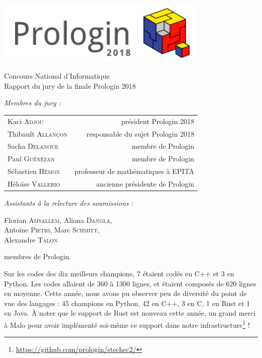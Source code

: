 \documentclass[a4paper,12pt,notitle,noheader,nofooter]{prologin}
\begin{document}
\begin{titlepage}
\begin{center}
\includegraphics[width=10cm]{../prologin2018}

\vspace{2.4cm}
{
 \Huge \textsf{Concours National d'Informatique}\\
 \vspace{1em}
 \Large Rapport du jury de la finale Prologin 2018
 \vspace{0.5cm}
}
\end{center}
\textit{Membres du jury :}
\begin{center}
\begin{tabular}{l r}
Kaci \textsc{Adjou} & président Prologin 2018 \\
Thibault \textsc{Allançon} & responsable du sujet Prologin 2018 \\
Sacha \textsc{Delanoue} & membre de Prologin \\
Paul \textsc{Guénézan} & membre de Prologin \\
Sébastien \textsc{Hémon} & professeur de mathématiques à EPITA \\
Héloïse \textsc{Vallerio} & ancienne présidente de Prologin
\end{tabular}
\end{center}
\textit{Assistants à la relecture des soumissions :}
\begin{center}
Florian \textsc{Amsallem}, Aliona \textsc{Dangla}, \\
Antoine \textsc{Pietri}, Marc \textsc{Schmitt}, \\
Alexandre \textsc{Talon}

\end{center}
\quad membres de Prologin.
\end{titlepage}


Sur les codes des dix meilleurs champions, 7 étaient codés en C++ et 3 en
Python. Les codes allaient de 360 à 1300 lignes, et étaient composés de 620
lignes en moyenne. Cette année, nous avons pu observer peu de diversité du point
de vue des langages : 45 champions en Python, 42 en C++, 3 en C, 1 en Rust et 1
en Java. À noter que le support de Rust est nouveau cette année, un grand merci
à Malo pour avoir implémenté soi-même ce support dans notre
infrastructure\footnote{\url{https://github.com/prologin/stechec2/}} !
\end{document}
